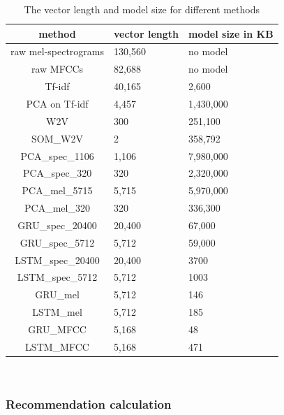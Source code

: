 \begin{table}[h]
\centering
\renewcommand{\arraystretch}{1.5}
\begin{tabu} to 1\textwidth {| c || X[c] | X[c] | }
 \hline
 \textbf{method} & \textbf{vector length} & \textbf{model size in KB} \\
 \hline
 raw mel-spectrograms & 130,560 & no model \\
 \hline 
 raw MFCCs & 82,688 & no model \\
 \hline
 Tf-idf & 40,165 & 2,600 \\
 \hline
 PCA on Tf-idf & 4,457 & 1,430,000  \\
 \hline
 W2V & 300 & 251,100 \\
 \hline
 SOM\_W2V & 2 & 358,792 \\
 \hline
 PCA\_spec\_1106 & 1,106 & 7,980,000 \\
 \hline
 PCA\_spec\_320 & 320 & 2,320,000\\
 \hline
 PCA\_mel\_5715 & 5,715 & 5,970,000\\
 \hline
 PCA\_mel\_320 & 320 & 336,300 \\
 \hline
 GRU\_spec\_20400 & 20,400 & 67,000 \\
 \hline
 GRU\_spec\_5712 & 5,712 & 59,000 \\
 \hline
 LSTM\_spec\_20400 & 20,400 & 3700 \\
 \hline
 LSTM\_spec\_5712 & 5,712 & 1003 \\
 \hline
 GRU\_mel & 5,712 & 146 \\
 \hline
 LSTM\_mel & 5,712 & 185 \\
 \hline
 GRU\_MFCC & 5,168 & 48 \\
 \hline
 LSTM\_MFCC & 5,168 & 471 \\
 \hline
 \end{tabu} \\
\caption{The vector length and model size for different methods}
\label{table:time_space_complexities}
\end{table}

\subsubsection{Recommendation calculation}

